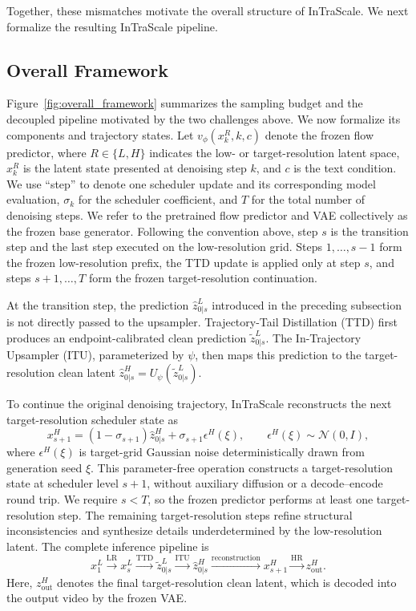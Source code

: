 \documentclass[letterpaper]{article} %
\begin{document}
Together, these mismatches motivate the overall structure of InTraScale. We next formalize
the resulting InTraScale pipeline.

\subsection{Overall Framework}

Figure~\ref{fig:overall_framework} summarizes the sampling budget and the
decoupled pipeline motivated by the two challenges above. We now formalize
its components and trajectory states.
Let \(v_\phi(x_k^R,k,c)\) denote the frozen flow predictor, where
\(R\in\{L,H\}\) indicates the low- or target-resolution latent space,
\(x_k^R\) is the latent state presented at denoising step \(k\), and \(c\) is
the text condition. We use ``step'' to denote one scheduler update and its
corresponding model evaluation, \(\sigma_k\) for the scheduler coefficient, and
\(T\) for the total number of denoising steps.
We refer to the pretrained flow predictor and VAE collectively as the frozen
base generator. Following the convention above, step \(s\) is the
transition step and the last step executed on the low-resolution
grid. Steps \(1,\ldots,s-1\) form the frozen low-resolution prefix, the
TTD update is applied only at step \(s\), and steps
\(s+1,\ldots,T\) form the frozen target-resolution continuation.

At the transition step, the prediction
\(\widehat{z}_{0|s}^{L}\) introduced in the preceding subsection is not
directly passed to the upsampler. Trajectory-Tail Distillation
(TTD) first produces an endpoint-calibrated clean prediction
\(\widetilde{z}_{0|s}^{L}\). The In-Trajectory Upsampler (ITU), parameterized
by \(\psi\), then maps this prediction to the target-resolution clean latent
\(\widehat{z}_{0|s}^{H}=U_\psi(\widetilde{z}_{0|s}^{L})\).

To continue the original denoising trajectory, InTraScale reconstructs the
next target-resolution scheduler state as
\[
x_{s+1}^{H}
=
(1-\sigma_{s+1})\widehat{z}_{0|s}^{H}
+
\sigma_{s+1}\epsilon^{H}(\xi),
\qquad
\epsilon^{H}(\xi)\sim\mathcal{N}(0,I),
\]
  where \(\epsilon^{H}(\xi)\) is target-grid Gaussian noise deterministically
  drawn from generation seed \(\xi\). This parameter-free operation
constructs a target-resolution state at scheduler level \(s+1\), without
auxiliary diffusion or a decode--encode round trip. We require
\(s<T\), so the frozen predictor performs at least one target-resolution
step. The remaining target-resolution steps refine structural
inconsistencies and synthesize details underdetermined by the low-resolution
latent. The complete inference pipeline is
\[
x_1^{L}
\xrightarrow{\text{LR}}
x_s^{L}
\xrightarrow{\text{TTD}}
\widetilde{z}_{0|s}^{L}
\xrightarrow{\text{ITU}}
\widehat{z}_{0|s}^{H}
\xrightarrow{\text{reconstruction}}
x_{s+1}^{H}
\xrightarrow{\text{HR}}
z_{\mathrm{out}}^{H}.
\]
Here, \(z_{\mathrm{out}}^{H}\) denotes the final target-resolution clean latent,
which is decoded into the output video by the frozen VAE.
\end{document}
